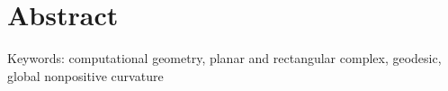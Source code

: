 \chapter*{Abstract}
\lipsum[1]

\vspace{0.5cm}
Keywords: computational geometry, planar and rectangular complex, geodesic, global nonpositive curvature
